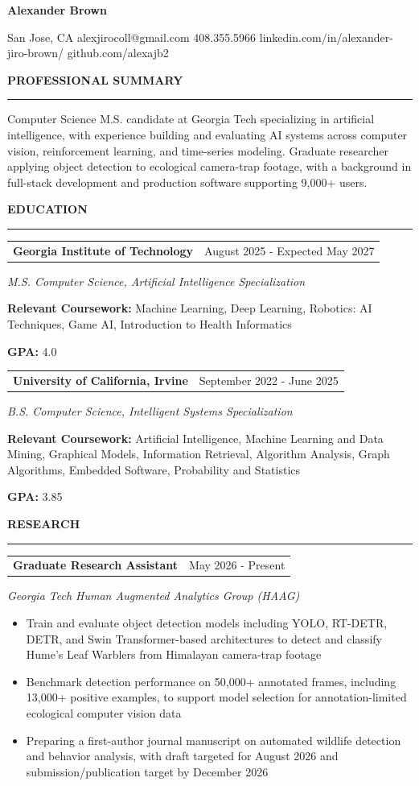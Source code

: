 \documentclass[10pt,letterpaper]{article}
\makeatletter
\newcommand{\ressection}[1]{%
  \vspace{6pt}%
  {\fontsize{11.5pt}{12pt}\selectfont\bfseries\MakeUppercase{#1}}%
  \vspace{1pt}\par\hrule\vspace{3pt}%
}
\newcommand{\entryheading}[2]{%
  \begin{tabular*}{\textwidth}{@{\extracolsep{\fill}}lr}
    \textbf{#1} & #2
  \end{tabular*}%
}
\makeatother
\begin{document}
\begin{center}
  {\fontsize{18.5pt}{19pt}\selectfont\bfseries Alexander Brown}\par
  \vspace{2pt}
  {\fontsize{9.6pt}{10.5pt}\selectfont
  San Jose, CA \textbar{} alexjirocoll@gmail.com \textbar{} 408.355.5966 \textbar{}
  linkedin.com/in/alexander-jiro-brown/ \textbar{} github.com/alexajb2}
\end{center}
\vspace{-5pt}

\ressection{Professional Summary}
Computer Science M.S. candidate at Georgia Tech specializing in artificial intelligence, with experience building and evaluating AI systems across computer vision, reinforcement learning, and time-series modeling. Graduate researcher applying object detection to ecological camera-trap footage, with a background in full-stack development and production software supporting 9,000+ users.

\ressection{Education}
\entryheading{Georgia Institute of Technology}{August 2025 - Expected May 2027}
\textit{M.S. Computer Science, Artificial Intelligence Specialization}\par
\textbf{Relevant Coursework:} Machine Learning, Deep Learning, Robotics: AI Techniques, Game AI, Introduction to Health Informatics\par
\textbf{GPA:} 4.0

\vspace{3pt}
\entryheading{University of California, Irvine}{September 2022 - June 2025}
\textit{B.S. Computer Science, Intelligent Systems Specialization}\par
\textbf{Relevant Coursework:} Artificial Intelligence, Machine Learning and Data Mining, Graphical Models, Information Retrieval, Algorithm Analysis, Graph Algorithms, Embedded Software, Probability and Statistics\par
\textbf{GPA:} 3.85

\ressection{Research}
\entryheading{Graduate Research Assistant}{May 2026 - Present}
\textit{Georgia Tech Human Augmented Analytics Group (HAAG)}
\begin{itemize}
  \item Train and evaluate object detection models including YOLO, RT-DETR, DETR, and Swin Transformer-based architectures to detect and classify Hume's Leaf Warblers from Himalayan camera-trap footage
  \item Benchmark detection performance on 50,000+ annotated frames, including 13,000+ positive examples, to support model selection for annotation-limited ecological computer vision data
  \item Preparing a first-author journal manuscript on automated wildlife detection and behavior analysis, with draft targeted for August 2026 and submission/publication target by December 2026
\end{itemize}
\end{document}
